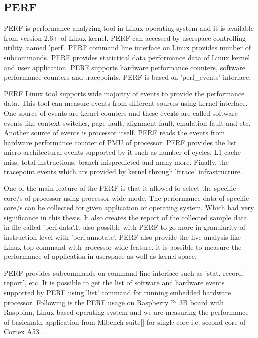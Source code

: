 \subsection{PERF}
PERF is performance analyzing tool in Linux operating system and it is available from version 2.6+ of Linux kernel. PERF can accessed by userspace controlling utility, named 'perf'. PERF command line interface on Linux provides number of subcommands. PERF provides statictical data performance data of Linux kernel and user application. PERF supports hardware performance counters, software performance counters and tracepoints. PERF is based on 'perf\_events' interface. 

\par PERF Linux tool supports wide majority of events to provide the performance data. This tool can measure events from different sources using kernel interface. One source of events are kernel counters and these events are called software events like context switches, page-fault, alignment fault, emulation fault and etc. Another source of events is processor itself. PERF reads the events from hardware performance counter of PMU of processor. PERF provides the list micro-architectural events supported by it such as number of cycles, L1 cache miss, total instructions, branch mispredicted and many more.  Finally, the tracepoint events which are provided by kernel through 'ftrace' infrastructure.

\par One of the main feature of the PERF is that it allowed to select the specific core/s of processor using processor-wide mode. The performance data of specific core/s  can be collected for given application or operating system. Which had very significance in this thesis. It also creates the report of the collected sample data in file called 'perf.data'.It also possible with PERF to go more in granularity of instruction level with 'perf annotate'. 	PERF also provide the live analysis like Linux top command with processor wide feature. it is possible to measure the performance of application in userspace as well as kernel space. 

\par PERF provides subcommands on command line interface such as 'stat, record, report', etc. It is possible to get the list of software and hardware events supported by PERF using 'list' command for running embedded hardware processor. Following is the PERF usage on Raspberry Pi 3B board with Raspbian, Linux based operating system and we are measuring the performance of basicmath application from Mibench suite[] for single core i.e. second core of Cortex A53..


